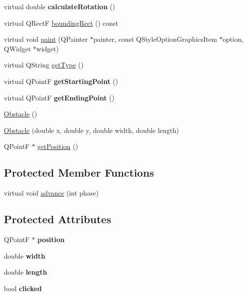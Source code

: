 \begin{DoxyCompactItemize}
virtual double {\bfseries calculate\+Rotation} ()
\item 
virtual Q\+RectF \mbox{\hyperlink{class_obstacle_a6f02b341e339ea27c3391a44c787b5f2}{bounding\+Rect}} () const
\item 
virtual void \mbox{\hyperlink{class_obstacle_a42945fd08ee06a3bc33199f4f2ca37c1}{paint}} (Q\+Painter $\ast$painter, const Q\+Style\+Option\+Graphics\+Item $\ast$option, Q\+Widget $\ast$widget)
\item 
virtual Q\+String \mbox{\hyperlink{class_obstacle_a14ba5e7996c9e0a0bd3afc3bea5771ea}{get\+Type}} ()
\item 
\mbox{\label{class_obstacle_afccb1406e9f18b60f51da28213592379}} 
virtual Q\+PointF {\bfseries get\+Starting\+Point} ()
\item 
\mbox{\label{class_obstacle_a7b164b4542c63039e2a33af1fe571457}} 
virtual Q\+PointF {\bfseries get\+Ending\+Point} ()
\item 
\mbox{\hyperlink{class_obstacle_a8f734072321fa06a7b7dae2d5f50f352}{Obstacle}} ()
\item 
\mbox{\hyperlink{class_obstacle_ab31bcc85e9865eb103d86196c640cbe5}{Obstacle}} (double x, double y, double width, double length)
\item 
Q\+PointF $\ast$ \mbox{\hyperlink{class_obstacle_acc23c6ded38190d10b50e6190a85744e}{get\+Position}} ()
\end{DoxyCompactItemize}
\subsection*{Protected Member Functions}
\begin{DoxyCompactItemize}
\item 
virtual void \mbox{\hyperlink{class_obstacle_ac3bcd488b16a8d8cf99875c6d0172e15}{advance}} (int phase)
\end{DoxyCompactItemize}
\subsection*{Protected Attributes}
\begin{DoxyCompactItemize}
\item 
\mbox{\label{class_obstacle_a585c9f0982084573c2e1172076aac502}} 
Q\+PointF $\ast$ {\bfseries position}
\item 
\mbox{\label{class_obstacle_aea38cecf56d04b14398c07388c6cdc5d}} 
double {\bfseries width}
\item 
\mbox{\label{class_obstacle_a71008c9d9ddaa8faa92e3ec1973fc572}} 
double {\bfseries length}
\item 
\mbox{\label{class_obstacle_ae712955c5f72f3ac00e460702950130c}} 
bool {\bfseries clicked}
\end{DoxyCompactItemize}


